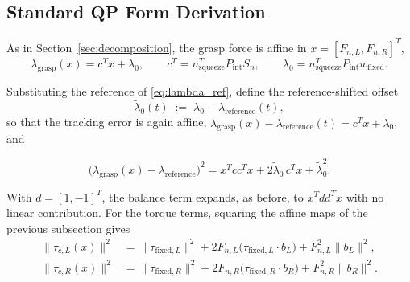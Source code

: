 \documentclass[conference]{IEEEtran}
\begin{document}
\subsection{Standard QP Form Derivation}
\label{sec:qp_derivation}

As in Section~\ref{sec:decomposition}, the grasp force is affine in $x=[F_{n,L},F_{n,R}]^{T}$,
\begin{equation}
\lambda_{\mathrm{grasp}}(x) = c^{T}x+\lambda_0,
\qquad
c^{T}=n_{\mathrm{squeeze}}^{T}P_{\mathrm{int}}S_n,
\qquad
\lambda_0 = n_{\mathrm{squeeze}}^{T}P_{\mathrm{int}}w_{\mathrm{fixed}}.
\end{equation}

Substituting the reference of \eqref{eq:lambda_ref}, define the reference-shifted offset
\begin{equation}
\tilde\lambda_0(t) \;:=\; \lambda_0 - \lambda_{\mathrm{reference}}(t),
\end{equation}
so that the tracking error is again affine, $\lambda_{\mathrm{grasp}}(x)-\lambda_{\mathrm{reference}}(t)=c^{T}x+\tilde\lambda_0$, and

\begin{equation}
\big(\lambda_{\mathrm{grasp}}(x)-\lambda_{\mathrm{reference}}\big)^2
= x^{T}cc^{T}x + 2\tilde\lambda_0\,c^{T}x + \tilde\lambda_0^{2}.
\end{equation}

With $d=[1,-1]^{T}$, the balance term expands, as before, to $x^{T}dd^{T}x$ with no linear contribution. For the torque terms, squaring the affine maps of the previous subsection gives
\begin{align}
\lVert\tau_{c,L}(x)\rVert^2 &= \lVert\tau_{\mathrm{fixed},L}\rVert^2 + 2F_{n,L}\big(\tau_{\mathrm{fixed},L}\cdot b_L\big) + F_{n,L}^{2}\lVert b_L\rVert^2, \\
\lVert\tau_{c,R}(x)\rVert^2 &= \lVert\tau_{\mathrm{fixed},R}\rVert^2 + 2F_{n,R}\big(\tau_{\mathrm{fixed},R}\cdot b_R\big) + F_{n,R}^{2}\lVert b_R\rVert^2.
\end{align}
\end{document}
